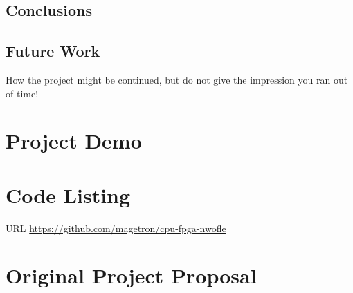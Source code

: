 \documentclass[a4paper]{report}
\begin{document}
\section{Conclusions}

\section{Future Work}
How the project might be continued, but do not give the impression you ran out of time!

\printbibliography[title=References]

\appendix

\chapter{Project Demo}

\chapter{Code Listing}

URL \url{https://github.com/magetron/cpu-fpga-nwofle}

\chapter{Original Project Proposal}
\end{document}
